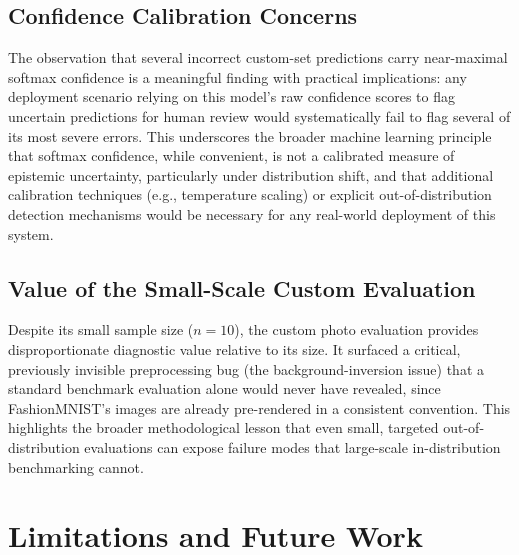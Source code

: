 \documentclass[12pt,a4paper]{report}
\begin{document}
\section{Confidence Calibration Concerns}
The observation that several incorrect custom-set predictions carry near-maximal softmax confidence is a meaningful finding with practical implications: any deployment scenario relying on this model's raw confidence scores to flag uncertain predictions for human review would systematically fail to flag several of its most severe errors. This underscores the broader machine learning principle that softmax confidence, while convenient, is not a calibrated measure of epistemic uncertainty, particularly under distribution shift, and that additional calibration techniques (e.g., temperature scaling) or explicit out-of-distribution detection mechanisms would be necessary for any real-world deployment of this system.

\section{Value of the Small-Scale Custom Evaluation}
Despite its small sample size ($n=10$), the custom photo evaluation provides disproportionate diagnostic value relative to its size. It surfaced a critical, previously invisible preprocessing bug (the background-inversion issue) that a standard benchmark evaluation alone would never have revealed, since FashionMNIST's images are already pre-rendered in a consistent convention. This highlights the broader methodological lesson that even small, targeted out-of-distribution evaluations can expose failure modes that large-scale in-distribution benchmarking cannot.

\chapter{Limitations and Future Work}
\end{document}
